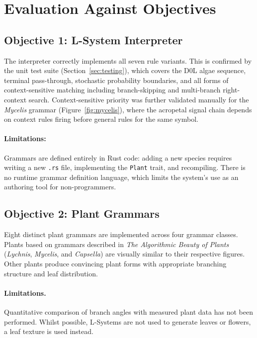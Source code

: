 \section{Evaluation Against Objectives}

\subsection{Objective 1: L-System Interpreter}

The interpreter correctly implements all seven rule variants. This is confirmed by the unit test suite
(Section~\ref{sec:testing}), which covers the D0L algae sequence, terminal pass-through, stochastic
probability boundaries, and all forms of context-sensitive matching including branch-skipping and
multi-branch right-context search. Context-sensitive priority was further validated manually for the
\textit{Mycelis} grammar (Figure~\ref{fig:mycelis}), where the acropetal signal chain depends on context
rules firing before general rules for the same symbol.

\paragraph{Limitations:}
Grammars are defined entirely in Rust code: adding a new species requires writing a new \texttt{.rs} file,
implementing the \texttt{Plant} trait, and recompiling. There is no runtime grammar definition language,
which limits the system's use as an authoring tool for non-programmers.

\subsection{Objective 2: Plant Grammars}

Eight distinct plant grammars are implemented across four grammar classes. Plants based on grammars described
in \textit{The Algorithmic Beauty of Plants} (\textit{Lychnis}, \textit{Mycelis}, and \textit{Capsella}) are
visually similar to their respective figures. Other plants produce convincing plant forms with appropriate
branching structure and leaf distribution.

\paragraph{Limitations.}
Quantitative comparison of branch angles with measured plant data has not been performed. Whilst possible,
L-Systems are not used to generate leaves or flowers, a leaf texture is used instead.

